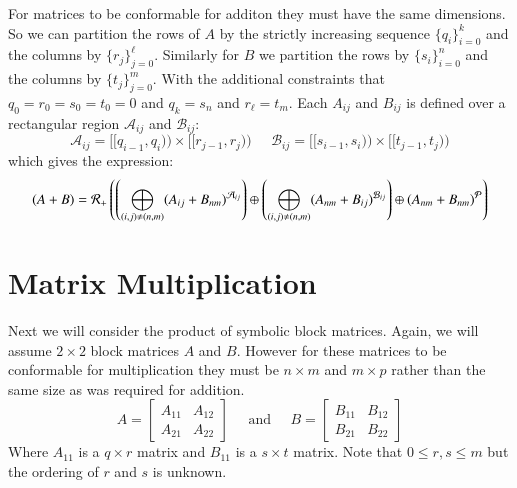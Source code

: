 For matrices to be conformable for additon they must have the same dimensions.
So we can partition the rows of $A$ by the strictly increasing sequence $\{q_i\}_{i=0}^k$ and 
the columns by $\{r_j \}_{j=0}^\ell$.
Similarly for $B$ we partition the rows by $\{s_i\}_{i=0}^n$ and the columns by $\{t_j\}_{j=0}^m$.
With the additional constraints that ${q_0 = r_0 = s_0 = t_0 = 0}$ and $q_k = s_n$ and $r_\ell = t_m$.
Each $A_{ij}$ and $B_{ij}$ is defined over a rectangular region $\mathcal{A}_{ij}$ and $\mathcal{B}_{ij}$:
 \begin{equation*}
	\mathcal{A}_{ij} = [\![q_{i-1}, q_i )\!) \times [\![ r_{j-1}, r_{j} )\!)
	\;\;\;\;\;
	\mathcal{B}_{ij} = [\![s_{i-1}, s_i )\!) \times [\![ t_{j-1}, t_{j} )\!)
\end{equation*}
which gives the expression:
\begin{equation}
	(A+B) = \R[+] \left( 
		\left( \bigoplus_{(i,j) \neq (n,m)} (A_{ij} + B_{nm})^{\mathcal{A}_{ij}} \right) \oplus
		\left( \bigoplus_{(i,j) \neq (n,m)} (A_{nm} + B_{ij})^{\mathcal{B}_{ij}} \right) \oplus
			(A_{nm} + B_{nm})^{\mathcal{P}} 
	\right)
\end{equation}




%
\section{Matrix Multiplication}


Next we will consider the product of symbolic block matrices.
Again, we will assume $2 \times 2$ block matrices $A$ and $B$.
However for these matrices to be conformable for multiplication they must be  $n \times m$ and $m \times p$ rather than
the same size as was required for addition.
\begin{equation}
	A = \begin{bmatrix} A_{11} & A_{12} \\ A_{21} & A_{22} \end{bmatrix}
	\;\;\;\;\; \text{and} \;\;\;\;\;
	B = \begin{bmatrix} B_{11} & B_{12} \\ B_{21} & B_{22} \end{bmatrix}
\end{equation}
Where $A_{11}$ is a $q \times r$ matrix and $B_{11}$ is a $s \times t$ matrix.
Note that $0 \leq r , s \leq m$ but the ordering of $r$ and $s$ is unknown.


